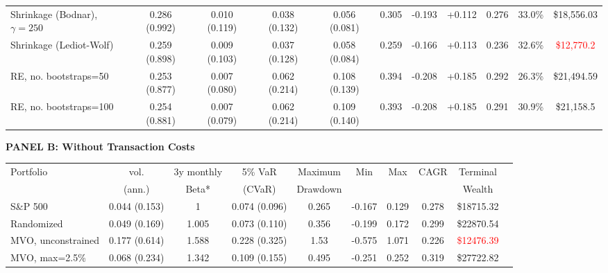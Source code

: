 \documentclass[12pt,letterpaper]{article}
\begin{document}
\begin{landscape}
\begin{table}[ht]
{\begin{tabular}{lcccccccccc}
Shrinkage (Bodnar), $\gamma=250$
& 0.286 (0.992) 
& 0.010 (0.119) 
& 0.038 (0.132) 
& 0.056 (0.081) 
& 0.305
& -0.193
& +0.112
& 0.276
& 33.0\%
& \textcolor{mygreen}{\$18,556.03} \\

Shrinkage (Lediot-Wolf)
& 0.259 (0.898) 
& 0.009 (0.103) 
& 0.037 (0.128) 
& 0.058 (0.084) 
& 0.259
& -0.166
& +0.113 
& 0.236
& 32.6\%
& \textcolor{red}{\$12,770.2} \\

RE, no. bootstraps=50
& 0.253 (0.877) 
& 0.007 (0.080) 
& 0.062 (0.214) 
& 0.108 (0.139)  
& 0.394
& -0.208
& +0.185
& 0.292
& 26.3\%
& \textcolor{mygreen}{\$21,494.59} \\

RE, no. bootstraps=100
& 0.254 (0.881) 
& 0.007 (0.079) 
& 0.062 (0.214) 
& 0.109 (0.140) 
& 0.393
& -0.208
& +0.185
& 0.291
& 30.9\%
& \textcolor{mygreen}{\$21,158.5} \\

\bottomrule
\end{tabular}
}

\vspace{0.5cm} %

{\footnotesize

\textbf{PANEL B: Without Transaction Costs} \\

\begin{tabular}{lccccccccc}
\toprule
Portfolio & vol. & 3y monthly & 5\% VaR & Maximum & Min & Max & CAGR & Terminal \\
       & (ann.) & Beta* & (CVaR) & Drawdown & & & & Wealth \\
\midrule

S\&P 500 
& 0.044 (0.153)
& 1
& 0.074 (0.096) 
& 0.265
& -0.167 
& 0.129 
& 0.278 
& \$18715.32 \\

Randomized 
& 0.049 (0.169) 
& 1.005
& 0.073 (0.110) 
& 0.356 
& -0.199
& 0.172 
& 0.299 
& \textcolor{mygreen}{\$22870.54} \\

MVO, unconstrained 
& 0.177 (0.614)
& 1.588
& 0.228 (0.325) 
& 1.53  
& -0.575 
& 1.071 
& 0.226 
& \textcolor{red}{\$12476.39} \\

MVO, max=2.5\%
& 0.068 (0.234)
& 1.342
& 0.109 (0.155) 
& 0.495 
& -0.251 
& 0.252 
& 0.319 
& \textcolor{mygreen}{\$27722.82} \\


\end{tabular}}
\end{table}
\end{landscape}
\end{document}
